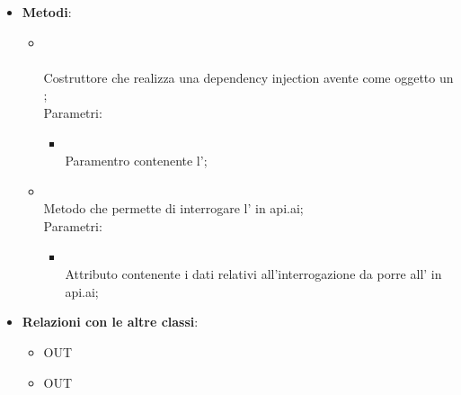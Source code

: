 \begin{itemize}
\begin{itemize}
	\end{itemize}
	\item \textbf{Metodi}:
	\begin{itemize}
		\item[]  \\\\		Costruttore che realizza una dependency injection avente come oggetto un ;\\
		Parametri:
		\begin{itemize}
			\item {} \\
			Paramentro contenente l';
		\end{itemize}
		\item[]  \\		Metodo che permette di interrogare l' in api.ai;\\
		Parametri:
		\begin{itemize}
			\item {} \\
			Attributo contenente i dati relativi all'interrogazione da porre all' in api.ai;
		\end{itemize}
	\end{itemize}
	\item \textbf{Relazioni con le altre classi}:
	\begin{itemize}
		\item OUT \hyperlink{Agent_label}{}
		\item OUT \hyperlink{VAQuery_label}{}
	\end{itemize}
\end{itemize}
\FloatBarrier


